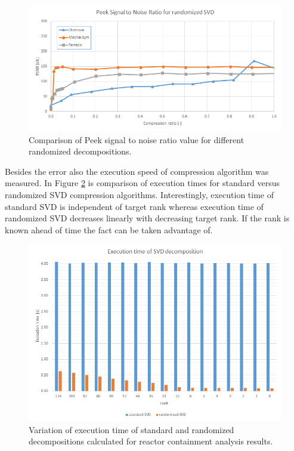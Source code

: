 \begin{figure}[H]
\centering
\includegraphics[width=\textwidth]{figures/appendix-SVD/PSNR_rand}
\decoRule
\caption{Comparison of Peek signal to noise ratio value for different randomized decompositions.}
\label{fig:PSNR_rand}
\end{figure}

Besides the error also the execution speed of compression algorithm was measured. In Figure \ref{fig:temelin:ExeTime} is comparison of execution times for standard versus randomized SVD compression algorithms. Interestingly, execution time of standard SVD is independent of target rank whereas execution time of randomized SVD decreases linearly with decreasing target rank. If the rank is known ahead of time the fact can be taken advantage of.

\begin{figure}[H]
\centering
\includegraphics[width=\textwidth]{figures/appendix-SVD/temelin_ExecutionTime}
\decoRule
\caption{Variation of execution time of standard and randomized decompositions calculated for reactor containment analysis results.}
\label{fig:temelin:ExeTime}
\end{figure}

